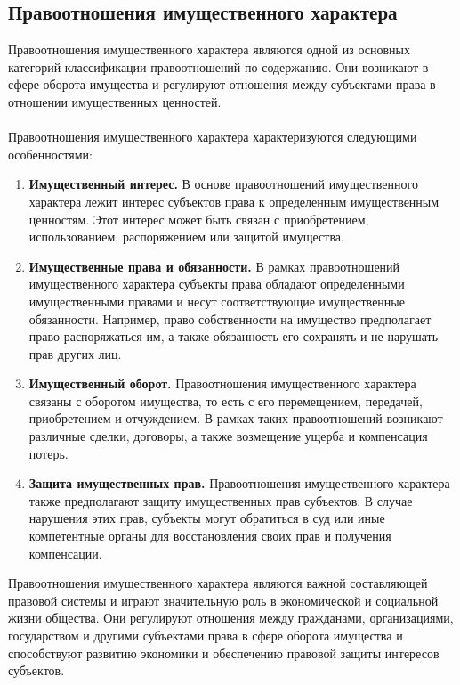 \documentclass{article}
\begin{document}
\subsection{Правоотношения имущественного характера}
Правоотношения имущественного характера являются одной из основных категорий классификации правоотношений по содержанию. Они возникают в сфере оборота имущества и регулируют отношения между субъектами права в отношении имущественных ценностей.\\
~\\
Правоотношения имущественного характера характеризуются следующими особенностями:
\begin{enumerate}
\item \textbf{Имущественный интерес.} В основе правоотношений имущественного характера лежит интерес субъектов права к определенным имущественным ценностям. Этот интерес может быть связан с приобретением, использованием, распоряжением или защитой имущества.
\item \textbf{Имущественные права и обязанности.} В рамках правоотношений имущественного характера субъекты права обладают определенными имущественными правами и несут соответствующие имущественные обязанности. Например, право собственности на имущество предполагает право распоряжаться им, а также обязанность его сохранять и не нарушать прав других лиц.
\item \textbf{Имущественный оборот.} Правоотношения имущественного характера связаны с оборотом имущества, то есть с его перемещением, передачей, приобретением и отчуждением. В рамках таких правоотношений возникают различные сделки, договоры, а также возмещение ущерба и компенсация потерь.
\item \textbf{Защита имущественных прав.} Правоотношения имущественного характера также предполагают защиту имущественных прав субъектов. В случае нарушения этих прав, субъекты могут обратиться в суд или иные компетентные органы для восстановления своих прав и получения компенсации.
\end{enumerate}
Правоотношения имущественного характера являются важной составляющей правовой системы и играют значительную роль в экономической и социальной жизни общества. Они регулируют отношения между гражданами, организациями, государством и другими субъектами права в сфере оборота имущества и способствуют развитию экономики и обеспечению правовой защиты интересов субъектов.
\end{document}
